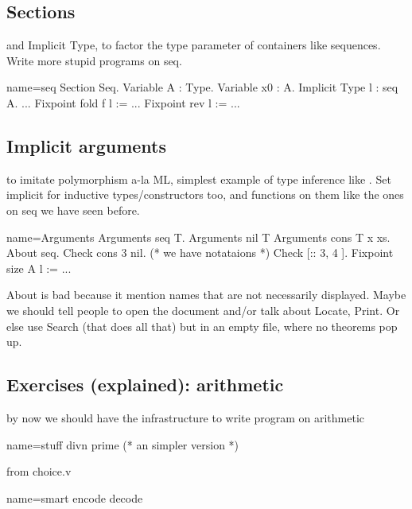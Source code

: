 \subsection{Sections}
and Implicit Type, to factor the type parameter of containers like
sequences.  Write more stupid programs on seq.

\begin{coq}{name=seq}{}
Section Seq.
Variable A : Type.
Variable x0 : A.
Implicit Type l : seq A.
...
Fixpoint fold f l := ...
Fixpoint rev l := ...
\end{coq}


\subsection{Implicit arguments}
to imitate polymorphism a-la ML, simplest example of type inference
like .  Set implicit for inductive types/constructors too,
and functions on them like the ones on seq we have seen before.

\begin{coq}{name=Arguments}{}
Arguments seq {T}.
Arguments nil {T}
Arguments cons {T} x xs.
About seq.
Check cons 3 nil.
(* we have notataions *)
Check [:: 3, 4 ].
Fixpoint size A l := ...
\end{coq}

About is bad because it mention names that are not necessarily displayed.
Maybe we should tell people to open the document and/or talk about Locate,
Print.  Or else use Search (that does all that) but in an empty
file, where no theorems pop up.

\subsection{Exercises (explained): arithmetic}
by now we should have the infrastructure to write program on arithmetic

\begin{coq}{name=stuff}{}
divn
prime  (* an simpler version *)
\end{coq}

from choice.v

\begin{coq}{name=smart}{}
encode
decode
\end{coq}
